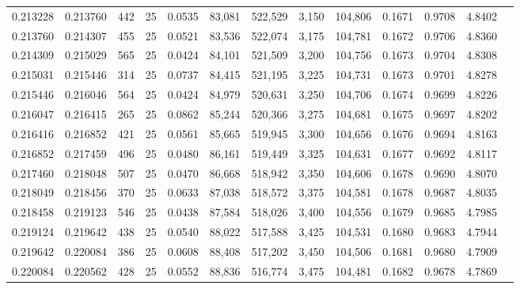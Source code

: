 \begin{tabular}{rrrrrrrrrrrrr}
0.213228 & 0.213760 &   442 &  25 &                                     0.0535 &  83,081 & 522,529 &   3,150 & 104,806 & 0.1671 & 0.9708 & 4.8402 \\
0.213760 & 0.214307 &   455 &  25 &                                     0.0521 &  83,536 & 522,074 &   3,175 & 104,781 & 0.1672 & 0.9706 & 4.8360 \\
0.214309 & 0.215029 &   565 &  25 &                                     0.0424 &  84,101 & 521,509 &   3,200 & 104,756 & 0.1673 & 0.9704 & 4.8308 \\
0.215031 & 0.215446 &   314 &  25 &                                     0.0737 &  84,415 & 521,195 &   3,225 & 104,731 & 0.1673 & 0.9701 & 4.8278 \\
0.215446 & 0.216046 &   564 &  25 &                                     0.0424 &  84,979 & 520,631 &   3,250 & 104,706 & 0.1674 & 0.9699 & 4.8226 \\
0.216047 & 0.216415 &   265 &  25 &                                     0.0862 &  85,244 & 520,366 &   3,275 & 104,681 & 0.1675 & 0.9697 & 4.8202 \\
0.216416 & 0.216852 &   421 &  25 &                                     0.0561 &  85,665 & 519,945 &   3,300 & 104,656 & 0.1676 & 0.9694 & 4.8163 \\
0.216852 & 0.217459 &   496 &  25 &                                     0.0480 &  86,161 & 519,449 &   3,325 & 104,631 & 0.1677 & 0.9692 & 4.8117 \\
0.217460 & 0.218048 &   507 &  25 &                                     0.0470 &  86,668 & 518,942 &   3,350 & 104,606 & 0.1678 & 0.9690 & 4.8070 \\
0.218049 & 0.218456 &   370 &  25 &                                     0.0633 &  87,038 & 518,572 &   3,375 & 104,581 & 0.1678 & 0.9687 & 4.8035 \\
0.218458 & 0.219123 &   546 &  25 &                                     0.0438 &  87,584 & 518,026 &   3,400 & 104,556 & 0.1679 & 0.9685 & 4.7985 \\
0.219124 & 0.219642 &   438 &  25 &                                     0.0540 &  88,022 & 517,588 &   3,425 & 104,531 & 0.1680 & 0.9683 & 4.7944 \\
0.219642 & 0.220084 &   386 &  25 &                                     0.0608 &  88,408 & 517,202 &   3,450 & 104,506 & 0.1681 & 0.9680 & 4.7909 \\
0.220084 & 0.220562 &   428 &  25 &                                     0.0552 &  88,836 & 516,774 &   3,475 & 104,481 & 0.1682 & 0.9678 & 4.7869 \\

\end{tabular}
